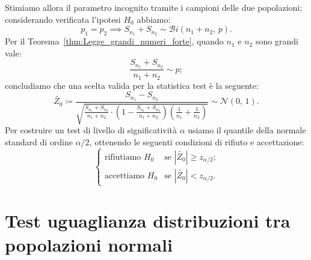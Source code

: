 \begin{defn}[Proporzione]
            Stimiamo allora il parametro incognito tramite i campioni delle due popolazioni; considerando 
            verificata l'ipotesi $H_0$ abbiamo: \[
                p_1 = p_2 \implies S_{n_1} + S_{n_2} \sim \mathcal{B}i(n_1+n_2,\, p)
            .\] Per il Teorema~\ref{thm:Legge_grandi_numeri_forte}, quando $n_1$ e $n_2$ sono grandi vale: \[
                \frac{S_{n_1} + S_{n_2}}{n_1 + n_2} \sim p
            ;\] concludiamo che una scelta valida per la statistica test è la seguente: \[
                \tilde{Z_0} \coloneqq \frac{S_{n_1} - S_{n_2}}{\sqrt{\frac{S_{n_1}+S_{n_2}}{n_1+n_2}\cdot
                \left(1- \frac{S_{n_1}+S_{n_2}}{n_1+n_2}\right)\left(\frac{1}{n_1}+\frac{1}{n_2}\right)}}
                \sim \mathcal{N}(0,\,1)
            .\] Per costruire un test di livello di significatività $\alpha$ usiamo il quantile della normale 
            standard di ordine $\alpha/2$, ottenendo le seguenti condizioni di rifiuto e accettazione: \[
                \begin{cases}
                    \text{rifiutiamo } H_0 & 
                    \text{se $|\tilde{Z_0}| \geq z_{\alpha /2}$;} \\
                    \text{accettiamo } H_0 & 
                    \text{se $|\tilde{Z_0}| < z_{\alpha /2}$.}
                \end{cases}
            \] 
        \end{defn}
    \section{Test uguaglianza distribuzioni tra popolazioni normali}

